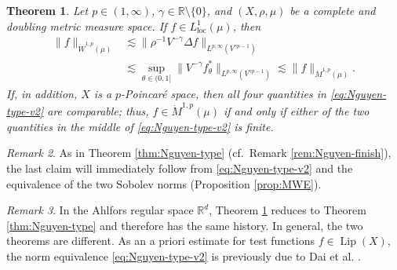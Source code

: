 \documentclass[11pt]{amsart}
\newtheorem{theorem}{Theorem}[section]
\theoremstyle{definition}
\theoremstyle{remark}
\newtheorem{remark}[theorem]{Remark}
\numberwithin{equation}{section}
\newcommand{\Norm}[2]{\|#1\|_{#2}}
\begin{document}
\begin{theorem}\label{thm-Nguyen-type-v2}
Let $p\in(1,\infty)$, $\gamma\in\mathbb{R}\setminus\{0\}$,
and $(X,\rho,\mu)$ be a complete and
doubling metric measure space. If $f\in L^1_{\mathrm{loc}}(\mu)$, then
\begin{subequations}\label{eq:Nguyen-type-v2}
\begin{align}
  \Norm{f}{\dot W^{1,p}(\mu)}
  &\lesssim\Norm{\rho^{-1}V^{-\gamma}\Delta f}{L^{p,\infty}(V^{\gamma p-1})}
    \label{eq:Nguyen-lower-v2} \\
  &\lesssim\sup_{\theta\in(0,1]}
    \Norm{V^{-\gamma} f_\theta^*}{L^{p,\infty}(V^{\gamma p-1})}
   \lesssim\Norm{f}{\dot M^{1,p}(\mu)}.
   \label{eq:Nguyen-upper-v2}
\end{align}
\end{subequations}
If, in addition, $X$ is a $p$-Poincar\'e space,
then all four quantities in \eqref{eq:Nguyen-type-v2} are comparable;
thus, $f\in\dot M^{1,p}(\mu)$ if and only if either of the two quantities
in the middle of \eqref{eq:Nguyen-type-v2} is finite.
\end{theorem}

\begin{remark}
As in Theorem \ref{thm:Nguyen-type} (cf.\ Remark \ref{rem:Nguyen-finish}), the last claim
will immediately follow from \eqref{eq:Nguyen-type-v2} and the equivalence of the two
Sobolev norms (Proposition \ref{prop:MWE}).
\end{remark}

\begin{remark}
In the Ahlfors regular space $\mathbb R^d$, Theorem \ref{thm-Nguyen-type-v2} reduces to
Theorem \ref{thm:Nguyen-type} and therefore has the same history. In general, the two
theorems are different.
As an a priori estimate for test functions $f\in\operatorname{Lip}(X)$, the norm equivalence
\eqref{eq:Nguyen-type-v2} is previously due to Dai et al. \cite[Theorem 1.8 and Corollary
1.9]{DLYYZ}.
\end{remark}
\end{document}
